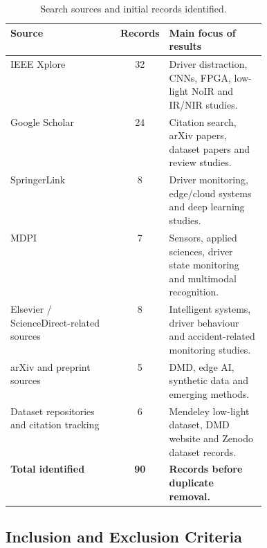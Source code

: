 \documentclass[11pt,a4paper]{article}
\let\oldsubsection\subsection
\renewcommand{\subsection}{\Needspace{6\baselineskip}\oldsubsection}
\begin{document}
\begin{table}[H]
\centering
\caption{Search sources and initial records identified.}
\label{tab:source_counts}
\small
\renewcommand{\arraystretch}{1.10}
\begin{tabularx}{0.92\linewidth}{>{\RaggedRight\arraybackslash}p{0.43\linewidth} c >{\RaggedRight\arraybackslash}X}
\toprule
\textbf{Source} & \textbf{Records} & \textbf{Main focus of results} \\
\midrule
IEEE Xplore & 32 & Driver distraction, CNNs, FPGA, low-light NoIR and IR/NIR studies. \\
Google Scholar & 24 & Citation search, arXiv papers, dataset papers and review studies. \\
SpringerLink & 8 & Driver monitoring, edge/cloud systems and deep learning studies. \\
MDPI & 7 & Sensors, applied sciences, driver state monitoring and multimodal recognition. \\
Elsevier / ScienceDirect-related sources & 8 & Intelligent systems, driver behaviour and accident-related monitoring studies. \\
arXiv and preprint sources & 5 & DMD, edge AI, synthetic data and emerging methods. \\
Dataset repositories and citation tracking & 6 & Mendeley low-light dataset, DMD website and Zenodo dataset records. \\
\midrule
\textbf{Total identified} & \textbf{90} & \textbf{Records before duplicate removal.} \\
\bottomrule
\end{tabularx}
\normalsize
\end{table}

\subsection{Inclusion and Exclusion Criteria}
\end{document}
